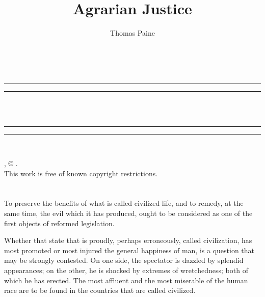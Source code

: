 \usepackage{fontspec}
\usepackage{xunicode}
\usepackage[english]{babel}
\usepackage{fancyhdr} 
\usepackage[htt]{hyphenat}
\usepackage[a5paper, top=2cm, bottom=1.5cm, left=2.5cm,right=1.5cm]{geometry}
\makeatletter
\date{}
\pagestyle{fancy}
\fancyhead{}
\fancyhead[CO,CE]{\thepage}
\fancyfoot{}
\makeatother
\title{Agrarian Justice}
\author{Thomas Paine}

\thispagestyle{empty}
\begin{center}
	{\Huge \@title   \\[5mm]}
\end{center}
\newpage
\thispagestyle{empty}
\cleardoublepage
\begin{center}
	\thispagestyle{empty}
	\vspace*{\baselineskip}
	\rule{\textwidth}{1.6pt}\vspace*{-\baselineskip}\vspace*{2pt}
	\rule{\textwidth}{0.4pt}\\[\baselineskip]
	{\Huge\scshape \@title   \\[5mm]}
	{\Large }
	\rule{\textwidth}{0.4pt}\vspace*{-\baselineskip}\vspace{3.2pt}
	\rule{\textwidth}{1.6pt}\\[\baselineskip]
	\vspace*{4\baselineskip}
	{\Large \@author}
	\vfill
\end{center}
\pagebreak
\newpage
\thispagestyle{empty}
\null\vfill
\noindent
\begin{center}
	{\emph{\@title}, © \@author.\\[5mm]}
	{This work is free of known copyright restrictions.\\[5mm]}
\end{center}
\pagebreak
\newpage
\setcounter{tocdepth}{0}
\setcounter{secnumdepth}{0}

\chapter*{}\label{chapter-0}
To preserve the benefits of what is called civilized life, and to remedy, at the same time, the evil which it has produced, ought to be considered as one of the first objects of reformed legislation.

Whether that state that is proudly, perhaps erroneously, called civilization, has most promoted or most injured the general happiness of man, is a question that may be strongly contested. On one side, the spectator is dazzled by splendid appearances; on the other, he is shocked by extremes of wretchedness; both of which he has erected. The most affluent and the most miserable of the human race are to be found in the countries that are called civilized.

